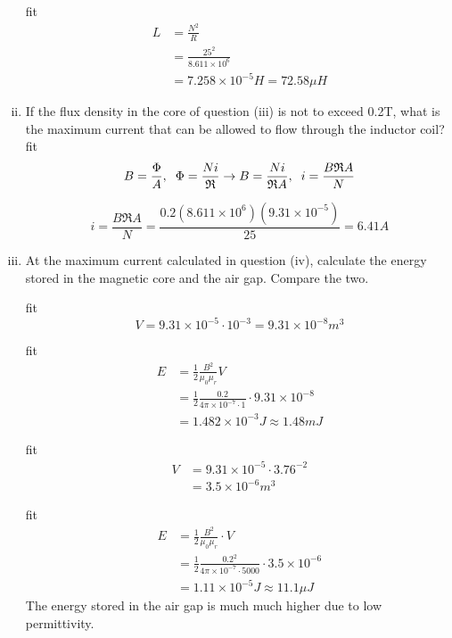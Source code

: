 \documentclass[a4paper,11pt]{article}
\begin{document}
\begin{enumerate}[i.]
          fit
          \begin{align*}
            L &= \frac{N^2}{R}\\ 
            &=\frac{25^2}{8.611\times 10^6}\\ 
            &= 7.258\times 10^{-5}H = 72.58\mu H
        \end{align*}

    \item If the flux density in the core of question (iii) is not to exceed 0.2T, what is the maximum current that can be allowed to flow through the inductor coil?
          fit
          $$B = \frac{\Phi}{A}, \hspace{2mm} \Phi = \frac{Ni}{\mathfrak{R}} \rightarrow B = \frac{Ni}{\mathfrak{R}A}, \hspace{2mm}i = \frac{B\mathfrak{R}A}{N}$$

          $$i = \frac{B\mathfrak{R}A}{N} = \frac{0.2(8.611\times10^6)(9.31\times 10^{-5})}{25} = 6.41A$$

    \newpage
    \item At the maximum current calculated in question (iv), calculate the energy stored in the magnetic core and the air gap. Compare the two.

          fit
          $$V = 9.31\times10^{-5}\cdot 10^{-3} = 9.31\times10^{-8}m^3$$

          fit
          \begin{align*}  
            E &= \frac{1}{2}\frac{B^2}{\mu_0 \mu_r}V\\ 
            &= \frac{1}{2}\frac{0.2}{4\pi\times10^{-7}\cdot 1}\cdot 9.31\times10^{-8}\\ 
            &= 1.482\times 10^{-3}J \approx 1.48m J
        \end{align*}

          fit
          \begin{align*}
            V &= 9.31\times10^{-5}\cdot 3.76^{-2}\\
             &= 3.5\times10^{-6}m^3
          \end{align*}

          fit
          \begin{align*}
            E &= \frac{1}{2}\frac{B^2}{\mu_0 \mu_r}\cdot V\\ 
            &= \frac{1}{2}\frac{0.2^2}{4\pi\times10^{-7}\cdot 5000}\cdot 3.5\times10^{-6}\\ 
            &= 1.11\times 10^{-5}J \approx 11.1\mu J
          \end{align*}
        The energy stored in the air gap is much much higher due to low permittivity.
\end{enumerate}
\end{document}
